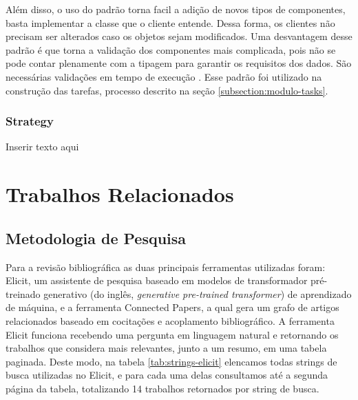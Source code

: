 \documentclass[12pt]{tcc}
\begin{document}
	Além disso, o uso do padrão torna facil a adição de novos tipos de componentes, basta implementar a classe que o cliente entende. Dessa forma, os clientes não precisam ser alterados caso os objetos sejam modificados. Uma desvantagem desse padrão é que torna a validação dos componentes mais complicada, pois não se pode contar plenamente com a tipagem para garantir os requisitos dos dados. São necessárias validações em tempo de execução \citep[Capítulo 4]{gamma1994design}. Esse padrão foi utilizado na construção das tarefas, processo descrito na seção \ref{subsection:modulo-tasks}.



	\subsection{Strategy}
	\label{subsection:strategy}
	Inserir texto aqui \citep{gamma1994design}


\chapter{Trabalhos Relacionados}
\label{cap:metodologiatrabsrelacionados}

	\section{Metodologia de Pesquisa}

	Para a revisão bibliográfica as duas principais ferramentas utilizadas foram: Elicit, um assistente de pesquisa baseado em modelos de transformador pré-treinado generativo (do inglês, \emph{generative pre-trained transformer}) de aprendizado de máquina, e a ferramenta Connected Papers, a qual  gera um grafo de artigos relacionados baseado em cocitações e acoplamento bibliográfico.
	A ferramenta Elicit funciona recebendo uma pergunta em linguagem natural e retornando os trabalhos que considera mais relevantes, junto a um resumo, em uma tabela paginada.
	Deste modo, na tabela \ref{tab:strings-elicit} elencamos todas strings de busca utilizadas no Elicit, e para cada uma delas consultamos até a segunda página da tabela, totalizando 14 trabalhos retornados por string de busca.
\end{document}
